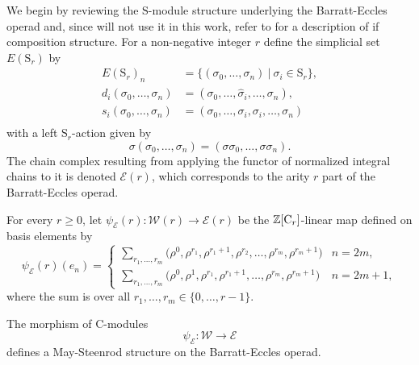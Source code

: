 We begin by reviewing the $\mathrm{S}$-module structure underlying the Barratt-Eccles operad and, since will not use it in this work, refer to \cite{berger04combinatorial} for a description of if composition structure.
For a non-negative integer $r$ define the simplicial set $E(\mathrm S_r)$ by 
\begin{equation} \label{eq: milnor model of symmetric}
\begin{split}
E(\mathrm S_r)_n &= \{ (\sigma_0, \dots, \sigma_n)\ |\ \sigma_i \in \mathrm{S}_r\}, \\
d_i(\sigma_0, \dots, \sigma_n) &= (\sigma_0, \dots, \widehat{\sigma}_i, \dots, \sigma_n), \\
s_i(\sigma_0, \dots, \sigma_n) &= (\sigma_0, \dots, \sigma_i, \sigma_i, \dots, \sigma_n) \\
\end{split}
\end{equation}
with a left $\mathrm S_r$-action given by
\begin{equation*}
\sigma (\sigma_0, \dots, \sigma_n) = (\sigma \sigma_0, \dots, \sigma \sigma_n).
\end{equation*} 
The chain complex resulting from applying the functor of normalized integral chains to it is denoted $\mathcal E(r)$, which corresponds to the arity $r$ part of the Barratt-Eccles operad.

\begin{definition} \label{def: Steenrod-Adem on Barratt-Eccles}
	For every $r \geq 0$, let $\psi_{\mathcal E}(r) \colon \mathcal W(r) \to \mathcal E(r)$ be the $\mathbb{Z}[\mathrm{C}_r]$-linear map defined on basis elements by 
	\begin{equation*}
	\psi_{\mathcal E}(r)(e_{n}) = \begin{cases}
	\displaystyle{\sum_{r_1, \dots, r_m}} \big(\rho^0, \rho^{r_1}, \rho^{r_1+1}, \rho^{r_2}, \dots, \rho^{r_{m}}, \rho^{r_{m}+1} \big) & n = 2m, \\
	\displaystyle{\sum_{r_1, \dots, r_m}} \big(\rho^0, \rho^1, \rho^{r_1}, \rho^{r_1+1}, \dots, \rho^{r_{m}}, \rho^{r_{m}+1} \big) & n = 2m+1,
	\end{cases}
	\end{equation*}
	where the sum is over all $r_1, \dots, r_m \in \{0, \dots, r-1\}$.
\end{definition}

\begin{theorem} \label{thm: Steenrod-Adem on Barratt-Eccles}
	The morphism of $\mathrm{C}$-modules
	\begin{equation*}
	\psi_{\mathcal E} \colon \mathcal W \to \mathcal E
	\end{equation*}
	defines a May-Steenrod structure on the Barratt-Eccles operad.
\end{theorem}

